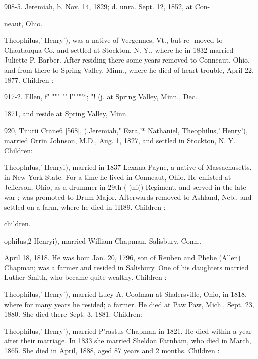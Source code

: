 \documentclass{book}
\begin{document}
908-5. Jeremiah, b. Nov. 14, 1829; d. unra. Sept. 12, 1852, at Con- 

neaut, Ohio. 







Theophilus,' Henry'), was a native of Vergennes, Vt., but re- 
moved to Chautauqua Co. and settled at Stockton, N. Y., where 
he in 1832 married Juliette P. Barber. After residing there some 
years removed to Conneaut, Ohio, and from there to Spring Valley, 
Minn., where he died of heart trouble, April 22, 1877. Children : 


917-2. Ellen, f" """ "' l'"""'*; "! (j. at Spring Valley, Minn., Dec. 



1871, and reside at Spring Valley, Minn. 

920, Tiiurii Crane6 [568], (.Jeremiah," Ezra,'* Nathaniel,  
Theophilus,' Henry'), married Orrin Johnson, M.D., Aug. 1, 
1827, and settled in Stockton, N. Y. Children: 



Theoplnlus,' Henryi), married in 1837 Lexana Payne, a native 
of Massachusetts, in New York State. For a time he lived in 
Conneaut, Ohio. He enlisted at Jefferson, Ohio, as a drummer 
in 29th ( )hi() Regiment, and served in the late war ; was promoted 
to Drum-Major. Afterwards removed to Ashland, Neb., and 
settled on a farm, where he died in 1H89. Children : 


children. 

ophilus,2 Henryi), married William Chapman, Salisbury, Conn., 




April 18, 1818. He was bom Jan. 20, 1796, son of Reuben and 
Phebe (Allen) Chapman; was a farmer and resided in Salisbury. 
One of his daughters married Luther Smith, who became quite 
wealthy. Children : 









Theophilus,' Henry'), married Lucy A. Coolman at Shalersville, 
Ohio, in 1818, where for many years he resided; a farmer. He 
died at Paw Paw, Mich., Sept. 23, 1880. She died there Sept. 
3, 1881. Children: 





Theophilus,' Henry'), married P'rastus Chapman in 1821. He 
died within a year after their marriage. In 1833 she married 
Sheldon Farnham, who died in March, 1865. She died in April, 
1888, aged 87 years and 2 months. Children : 
\end{document}
